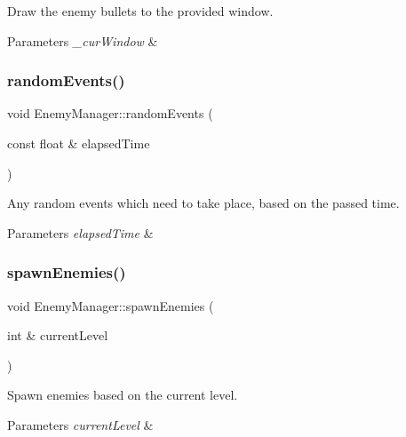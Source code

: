 Draw the enemy bullets to the provided window. 


\begin{DoxyParams}{Parameters}
{\em \+\_\+cur\+Window} & \\
\hline
\end{DoxyParams}
\mbox{\label{class_enemy_manager_abafa080764d42fbc020c33e48c7afb2f}} 
\subsubsection{\texorpdfstring{random\+Events()}{randomEvents()}}
{\footnotesize\ttfamily void Enemy\+Manager\+::random\+Events (\begin{DoxyParamCaption}\item[{const float \&}]{elapsed\+Time }\end{DoxyParamCaption})}



Any random events which need to take place, based on the passed time. 


\begin{DoxyParams}{Parameters}
{\em elapsed\+Time} & \\
\hline
\end{DoxyParams}
\mbox{\label{class_enemy_manager_a37036db8aad73493103815dc45c6339d}} 
\subsubsection{\texorpdfstring{spawn\+Enemies()}{spawnEnemies()}}
{\footnotesize\ttfamily void Enemy\+Manager\+::spawn\+Enemies (\begin{DoxyParamCaption}\item[{int \&}]{current\+Level }\end{DoxyParamCaption})}



Spawn enemies based on the current level. 


\begin{DoxyParams}{Parameters}
{\em current\+Level} & \\
\hline
\end{DoxyParams}
\mbox{\label{class_enemy_manager_a8a3caf890d121478e41dcc192a8aa4a2}} 
